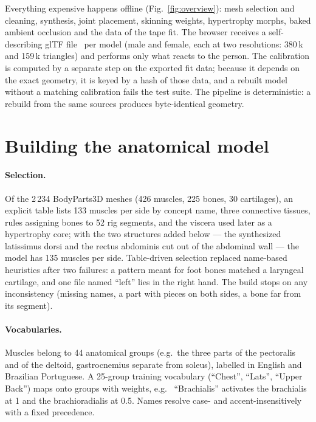 \documentclass[10pt,twocolumn]{article}
\newcommand{\eg}{e.g.\ }
\begin{document}
Everything expensive happens offline (Fig.~\ref{fig:overview}): mesh selection and cleaning,
synthesis, joint placement, skinning weights, hypertrophy morphs, baked ambient occlusion and the
data of the tape fit. The browser receives a self-describing glTF file~\cite{khronos2017gltf} per
model (male and female, each at two resolutions: 380\,k and 159\,k triangles) and performs only what
reacts to the person. The calibration is computed by a separate step on the exported fit data;
because it depends on the exact geometry, it is keyed by a hash of those data, and a rebuilt model
without a matching calibration fails the test suite. The pipeline is deterministic: a rebuild from
the same sources produces byte-identical geometry.

\section{Building the anatomical model}\label{sec:model}

\paragraph{Selection.}
Of the 2\,234 BodyParts3D meshes (426 muscles, 225 bones, 30 cartilages), an explicit table lists
133 muscles per side by concept name, three connective tissues, rules assigning bones to 52 rig
segments, and the viscera used later as a hypertrophy core; with the two structures added below ---
the synthesized latissimus dorsi and the rectus abdominis cut out of the abdominal wall --- the model
has 135 muscles per side. Table-driven selection replaced name-based heuristics after two failures:
a pattern meant for foot bones matched a laryngeal cartilage, and one file named ``left'' lies in
the right hand. The build stops on any inconsistency (missing names, a part with pieces on both
sides, a bone far from its segment).

\paragraph{Vocabularies.}
Muscles belong to 44 anatomical groups (\eg the three parts of the pectoralis and of the deltoid,
gastrocnemius separate from soleus), labelled in English and Brazilian Portuguese. A 25-group
training vocabulary (``Chest'', ``Lats'', ``Upper Back'') maps onto groups with weights, \eg
``Brachialis'' activates the brachialis at 1 and the brachioradialis at 0.5. Names resolve
case- and accent-insensitively with a fixed precedence.
\end{document}
